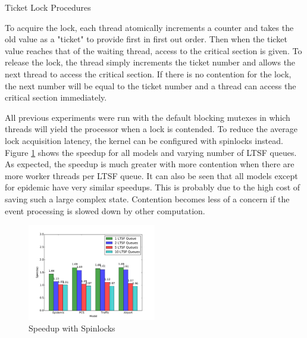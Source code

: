 \documentclass[11pt]{book}
\begin{document}
\begin{algorithm}
\DontPrintSemicolon
{}
\SetAlgoVlined

    \;


    \caption{Ticket Lock Procedures\cite{wiki:ticketlock-15}}\label{ticket_lock}
\end{algorithm}

\noindent
To acquire the lock, each thread atomically increments a counter and takes the old value as
a "ticket" to provide first in first out order. Then when the ticket value reaches that
of the waiting thread, access to the critical section is given. To release the lock, the thread
simply increments the ticket number and allows the next thread to access the critical section.
If there is no contention for the lock, the next number will be equal to the ticket number and
a thread can access the critical section immediately.

All previous experiments were run with the default blocking mutexes in which threads will yield
the processor when a lock is contended. To reduce the average lock acquisition latency, the
kernel can be configured with spinlocks instead. Figure \ref{spinlock_speedup} shows the speedup
for all models and varying number of LTSF queues. As expected, the speedup is much greater with
more contention when there are more worker threads per LTSF queue. It can also be seen that all
models except for epidemic have very similar speedups. This is probably due to the high cost
of saving such a large complex state. Contention becomes less of a concern if the event processing
is slowed down by other computation.

\begin{figure}
\centering
  \includegraphics[width=0.5\textwidth,quiet]{figs/pending_event_set/spinlock_speedup.pdf}
  \caption{Speedup with Spinlocks}\label{spinlock_speedup}
\end{figure}
\end{document}
